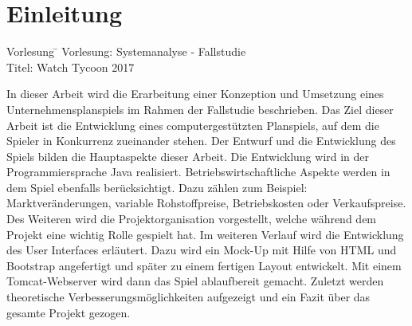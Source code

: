 \clearpage
\chapter{Einleitung}
\begin{tabbing}
Vorlesung
\hspace{0.2cm}\=\kill
Vorlesung: \> Systemanalyse - Fallstudie \\
Titel: \> Watch Tycoon 2017 
\end{tabbing}
In dieser Arbeit wird die Erarbeitung einer Konzeption und Umsetzung eines Unternehmensplanspiels
im Rahmen der Fallstudie beschrieben. Das Ziel dieser Arbeit ist die Entwicklung eines computergestützten Planspiels, auf dem die Spieler in Konkurrenz zueinander stehen. Der Entwurf und die Entwicklung des Spiels bilden die Hauptaspekte dieser Arbeit. Die Entwicklung wird in der Programmiersprache Java realisiert. Betriebswirtschaftliche Aspekte werden in dem Spiel
ebenfalls berücksichtigt. Dazu zählen zum Beispiel: Marktveränderungen, variable Rohstoffpreise, Betriebskosten oder Verkaufspreise. Des Weiteren wird die Projektorganisation vorgestellt, welche während dem Projekt eine wichtig Rolle gespielt hat.
Im weiteren Verlauf wird die Entwicklung des User Interfaces erläutert. Dazu wird ein Mock-Up mit Hilfe von HTML und Bootstrap angefertigt und später zu einem fertigen Layout entwickelt. Mit einem Tomcat-Webserver wird dann das Spiel ablaufbereit gemacht. Zuletzt werden theoretische Verbesserungsmöglichkeiten aufgezeigt und ein Fazit über das gesamte Projekt gezogen.   

